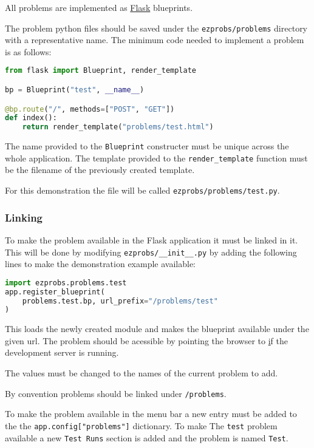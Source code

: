 All problems are implemented as
\href{https://flask.palletsprojects.com/}{Flask} blueprints.

The problem python files should be saved under the \verb+ezprobs/problems+
directory with a representative name. The minimum code needed to implement a
problem is as follows:

\begin{lstlisting}[language=python]
from flask import Blueprint, render_template

bp = Blueprint("test", __name__)

@bp.route("/", methods=["POST", "GET"])
def index():
    return render_template("problems/test.html")
\end{lstlisting}

The name provided to the \verb+Blueprint+ constructer must be unique across the
whole application. The template provided to the \verb+render_template+
function must be the filename of the previously created template.

For this demonstration the file will be called \verb+ezprobs/problems/test.py+.

\subsubsection{Linking}

To make the problem available in the Flask application it must be linked in it.
This will be done by modifying \verb+ezprobs/__init__.py+ by adding the
following lines to make the demonstration example available:

\begin{lstlisting}[language=python]
import ezprobs.problems.test
app.register_blueprint(
    problems.test.bp, url_prefix="/problems/test"
)
\end{lstlisting}

This loads the newly created module and makes the blueprint available under the
given url. The problem should be acessible by pointing the browser to
\href{http://localhost:5000/problems/test/} if the development server is running.

The values must be changed to the names of the current problem to add.

By convention problems should be linked under \verb+/problems+.

To make the problem available in the menu bar a new entry must be added to the
the \verb+app.config["problems"]+ dictionary. To make The \verb+test+ problem
available a new \verb+Test Runs+ section is added and the problem is named
\verb+Test+.

